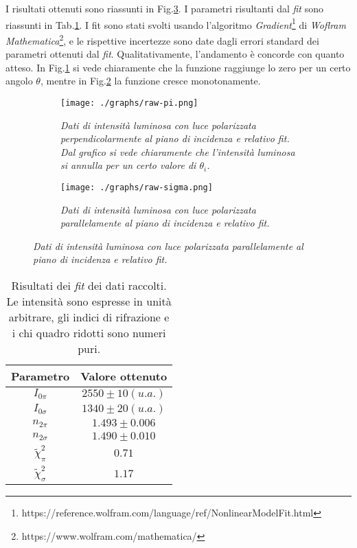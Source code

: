   I risultati ottenuti sono riassunti in Fig.\ref{fig:dati-raw}.
  I parametri risultanti dal \emph{fit} sono riassunti in Tab.\ref{tab:risultati-fit}.
  I fit sono stati svolti usando l'algoritmo \emph{Gradient}\footnote{https://reference.wolfram.com/language/ref/NonlinearModelFit.html} di \emph{Woflram Mathematica}\footnote{https://www.wolfram.com/mathematica/}, e le rispettive incertezze %
  sono date dagli errori standard dei parametri ottenuti dal \emph{fit}.                                          %
  Qualitativamente, l'andamento è concorde con quanto atteso. In Fig.\ref{fig:raw-pi}
  si vede chiaramente che la funzione raggiunge lo zero per un certo angolo $\theta$,
  mentre in Fig.\ref{fig:raw-sigma} la funzione cresce monotonamente.
  \begin{figure}[H]
    \centering
    \caption{Dati raccolti}
    \begin{subfigure}[t]{.4\textwidth}
      \texttt{[image: ./graphs/raw-pi.png]}
      \caption{
        \emph{
          Dati di intensità luminosa con luce polarizzata perpendicolarmente al
          piano di incidenza e relativo fit. Dal grafico si vede chiaramente che
          l'intensità luminosa si annulla per un certo valore di $\theta_i$.
        }
      }
      \label{fig:raw-pi}
    \end{subfigure}
    \hspace{20mm}
    \begin{subfigure}[t]{.4\textwidth}
      \texttt{[image: ./graphs/raw-sigma.png]}
      \caption{
        \emph{
          Dati di intensità luminosa con luce polarizzata parallelamente al
          piano di incidenza e relativo fit.
        }
      }
      \label{fig:raw-sigma}
    \end{subfigure}
    \label{fig:dati-raw}
  \end{figure}
  \begin{table}[ht]
    \centering
    \caption{
      Risultati dei \emph{fit} dei dati raccolti. Le intensità sono espresse in unità arbitrare, gli indici
      di rifrazione e i chi quadro ridotti sono numeri puri.
    }
    \begin{tabular}[t]{cc}
      \toprule
      Parametro &Valore ottenuto\\
      \midrule
      $I_{0\pi}$ &$2550 \pm 10 (u. a.)$ \\
      $I_{0\sigma}$ &$1340 \pm 20 (u. a.)$ \\
      $n_{2\pi}$ &$1.493 \pm 0.006$    \\
      $n_{2\sigma}$ &$1.490 \pm 0.010$    \\
      $\tilde \chi^2_\pi$ &$0.71$ \\
      $\tilde \chi^2_\sigma$ &$1.17$ \\
      \bottomrule
    \end{tabular}\label{tab:risultati-fit}
  \end{table}
